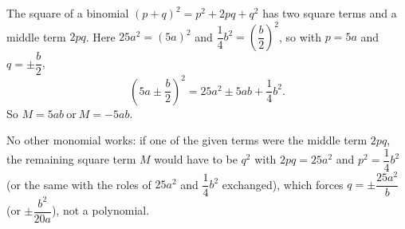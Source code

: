 The square of a binomial $(p+q)^2=p^2+2pq+q^2$ has two square terms and a middle term $2pq$. Here $25a^2=(5a)^2$ and $\dfrac{1}{4}b^2=\left(\dfrac {b}{2}\right)^2$, so with $p=5a$ and $q=\pm\dfrac {b}{2}$,
\[
\left(5a\pm\dfrac {b}{2}\right)^2=25a^2\pm5ab+\dfrac{1}{4}b^2 .
\]
So $\boxed{M=5ab\ \text{or}\ M=-5ab}$.

No other monomial works: if one of the given terms were the middle term $2pq$, the remaining square term $M$ would have to be $q^2$ with $2pq=25a^2$ and $p^2=\dfrac{1}{4}b^2$ (or the same with the roles of $25a^2$ and $\dfrac{1}{4}b^2$ exchanged), which forces $q=\pm\dfrac{25a^2}{b}$ (or $\pm\dfrac{b^2}{20a}$), not a polynomial.
